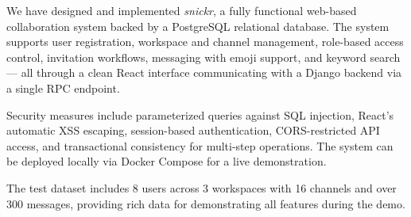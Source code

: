 \documentclass[11pt]{article}
\begin{document}
We have designed and implemented \textit{snickr}, a fully functional web-based collaboration system backed by a PostgreSQL relational database. The system supports user registration, workspace and channel management, role-based access control, invitation workflows, messaging with emoji support, and keyword search --- all through a clean React interface communicating with a Django backend via a single RPC endpoint.

Security measures include parameterized queries against SQL injection, React's automatic XSS escaping, session-based authentication, CORS-restricted API access, and transactional consistency for multi-step operations. The system can be deployed locally via Docker Compose for a live demonstration.

The test dataset includes 8 users across 3 workspaces with 16 channels and over 300 messages, providing rich data for demonstrating all features during the demo.
\end{document}
